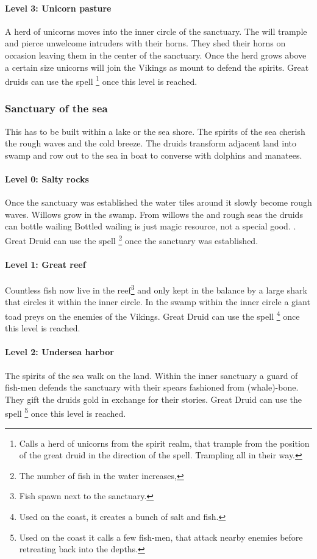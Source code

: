 \paragraph{Level 3: Unicorn pasture}
A herd of unicorns moves into the inner circle of the sanctuary. The will
trample and pierce unwelcome intruders with their horns. They shed their horns
on occasion leaving them in the center of the sanctuary. Once the herd grows
above a certain size unicorns will join the \gls{Vikings} as mount to defend
the spirits. Great druids can use the spell \footnote{ Calls a herd of unicorns from the spirit realm, that
	trample from the position of the great druid in the direction of the spell.
	Trampling all in their way. } once this level is reached.

\subsubsection{Sanctuary of the sea}
This has to be built within a lake or the sea shore. The spirits of the sea
cherish the rough waves and the cold breeze. The druids transform adjacent land
into swamp and row out to the sea in boat to converse with dolphins and
manatees.

\paragraph{Level 0: Salty rocks}
Once the sanctuary was established the water tiles around it slowly become
rough waves. Willows grow in the swamp. From willows the and rough seas the
druids can bottle wailing{ Bottled wailing is just magic resource, not a
		special good. }. Great Druid can use the spell \footnote{ The number of fish in the water increases, } once the
sanctuary was established.

\paragraph{Level 1: Great reef}
Countless fish now live in the reef\footnote{ Fish spawn next to the sanctuary.
} and only kept in the balance by a large shark that circles it within the
inner circle. In the swamp within the inner circle a giant toad preys on the
enemies of the \gls{Vikings}. Great Druid can use the spell \footnote{ Used on the coast, it creates a bunch of salt and fish. } once
this level is reached.

\paragraph{Level 2: Undersea harbor}
The spirits of the sea walk on the land. Within the inner sanctuary a guard of
fish-men defends the sanctuary with their spears fashioned from (whale)-bone.
They gift the druids gold in exchange for their stories. Great Druid can use
the spell \footnote{ Used on the coast it calls a few
	fish-men, that attack nearby enemies before retreating back into the depths. }
once this level is reached.

